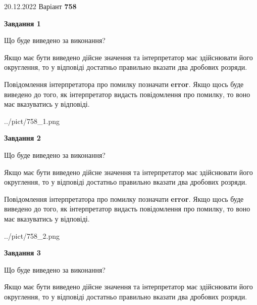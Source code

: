 \documentclass[12pt, ukrainian]{article}
\begin{document}
{20.12.2022 Варіант \No \textbf { 758 }\par}
{
\begin {Large}

{\begin {center}\textbf{Завдання 1}\end {center}}\par
Що буде виведено за виконання? \par

Якщо має бути виведено дійсне значення та інтерпретатор має здійснювати його округлення, 
то у відповіді достатньо правильно вказати два дробових розряди.

Повідомлення інтерпретатора про помилку позначати \textbf{error}.
Якщо щось буде виведено до того, як інтерпретатор видасть повідомлення про помилку, 
то воно має вказуватись у відповіді. \par

\begin{center}
	{../pict/758_1.png}
\end{center}
\newpage

{\begin {center}\textbf{Завдання 2}\end {center}}\par
Що буде виведено за виконання? \par

Якщо має бути виведено дійсне значення та інтерпретатор має здійснювати його округлення, 
то у відповіді достатньо правильно вказати два дробових розряди.

Повідомлення інтерпретатора про помилку позначати \textbf{error}.
Якщо щось буде виведено до того, як інтерпретатор видасть повідомлення про помилку, 
то воно має вказуватись у відповіді. \par

\begin{center}
	{../pict/758_2.png}
\end{center}
\newpage

{\begin {center}\textbf{Завдання 3}\end {center}}\par
Що буде виведено за виконання? \par

Якщо має бути виведено дійсне значення та інтерпретатор має здійснювати його округлення, 
то у відповіді достатньо правильно вказати два дробових розряди.


\end{Large}}
\end{document}
